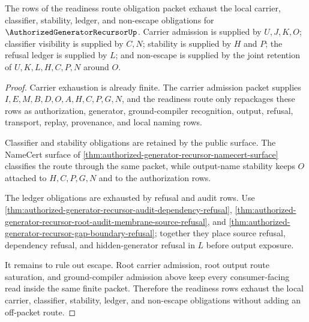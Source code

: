 \begin{theorem}
\label{thm:authorized-generator-recursor-namecert-obligation-exhaustion}
The rows of the readiness route obligation packet exhaust the local carrier,
classifier, stability, ledger, and non-escape obligations for
$\AuthorizedGeneratorRecursorUp$. Carrier admission is supplied by $U,J,K,O$;
classifier visibility is supplied by $C,N$; stability is supplied by $H$ and
$P$; the refusal ledger is supplied by $L$; and non-escape is supplied by the
joint retention of $U,K,L,H,C,P,N$ around $O$.
\end{theorem}
\begin{proof}
Carrier exhaustion is already finite. The carrier admission packet supplies
$I,E,M,B,D,O,A,H,C,P,G,N$, and the readiness route only repackages these rows
as authorization, generator, ground-compiler recognition, output, refusal,
transport, replay, provenance, and local naming rows.

Classifier and stability obligations are retained by the public surface. The
NameCert surface of \autoref{thm:authorized-generator-recursor-namecert-surface}
classifies the route through the same packet, while output-name stability keeps
$O$ attached to $H,C,P,G,N$ and to the authorization rows.

The ledger obligations are exhausted by refusal and audit rows. Use
\autoref{thm:authorized-generator-recursor-audit-dependency-refusal},
\autoref{thm:authorized-generator-recursor-root-audit-membrane-source-refusal},
and \autoref{thm:authorized-generator-recursor-gap-boundary-refusal}; together
they place source refusal, dependency refusal, and hidden-generator refusal in
$L$ before output exposure.

It remains to rule out escape. Root carrier admission, root output route
saturation, and ground-compiler admission above keep every consumer-facing read
inside the same finite packet. Therefore the readiness rows exhaust the local
carrier, classifier, stability, ledger, and non-escape obligations without
adding an off-packet route.
\end{proof}

